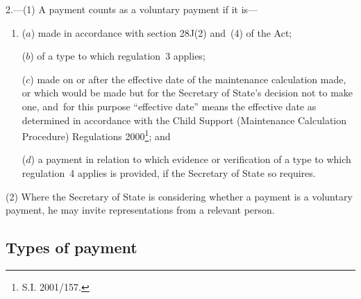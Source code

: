 \documentclass[12pt,a4paper]{article}
\begin{document}
2.---(1)  A payment counts as a voluntary payment if it is—
\begin{enumerate}\item[]
($a$) made in accordance with section 28J(2) and~(4) of the Act;

($b$) of a type to which regulation~3 applies;

($c$) made on or after the effective date of the maintenance calculation made, or which would be made but for the Secretary of State’s decision not to make one, and~for this purpose “effective date” means the effective date as determined in accordance with the Child Support (Maintenance Calculation Procedure) Regulations 2000\footnote{\frenchspacing S.I. 2001/157.}; and

($d$) a payment in relation to which evidence or verification of a type to which regulation~4 applies is provided, if the Secretary of State so requires.
\end{enumerate}

(2) Where the Secretary of State is considering whether a payment is a voluntary payment, he may invite representations from a relevant person.

\subsection[3. Types of payment]{Types of payment}
\end{document}
